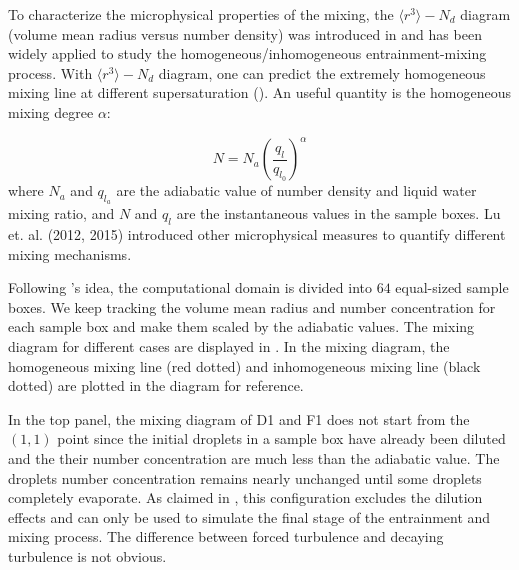 \documentclass[draft,jgrga]{AGUTeX}
\begin{document}
\begin{article}
To characterize the microphysical properties of the mixing, the $\langle r^3\rangle -N_d$ diagram (volume mean radius versus number density) was introduced in \cite{Burnet07} and has been widely applied to study the homogeneous/inhomogeneous entrainment-mixing process. With $\langle r^3\rangle -N_d$ diagram, one can predict the extremely homogeneous mixing line at different supersaturation (\cite{Lehmann09,Kumar14}). An useful quantity is the homogeneous mixing degree $\alpha$:

\begin{equation}
N=N_{a}(\frac{q_l}{q_{l_0}})^{\alpha}\label{eq:alpha}
\end{equation}
where $N_{a}$ and $q_{l_a}$ are the adiabatic value of number density and liquid water mixing ratio, and $N$ and $q_{l}$ are the instantaneous values in the sample boxes. Lu et. al. (2012, 2015) introduced other microphysical measures to quantify different mixing mechanisms.

Following \cite{Kumar14}'s idea, the computational domain is divided into $64$ equal-sized sample boxes. We keep tracking the volume mean radius and number concentration for each sample box and make them scaled by the adiabatic values. The mixing diagram for different cases are displayed in . In the mixing diagram, the homogeneous mixing line (red dotted) and inhomogeneous mixing line (black dotted) are plotted in the diagram for reference. 

In the top panel, the mixing diagram of D1 and F1 does not start from the $(1,1)$ point since the initial droplets in a sample box have already been diluted and the their number concentration are much less than the adiabatic value. The droplets number concentration remains nearly unchanged until some droplets completely evaporate. As claimed in \cite{And04}, this configuration excludes the dilution effects and can only be used to simulate the final stage of the entrainment and mixing process. The difference between forced turbulence and decaying turbulence is not obvious.


\end{article}
\end{document}
